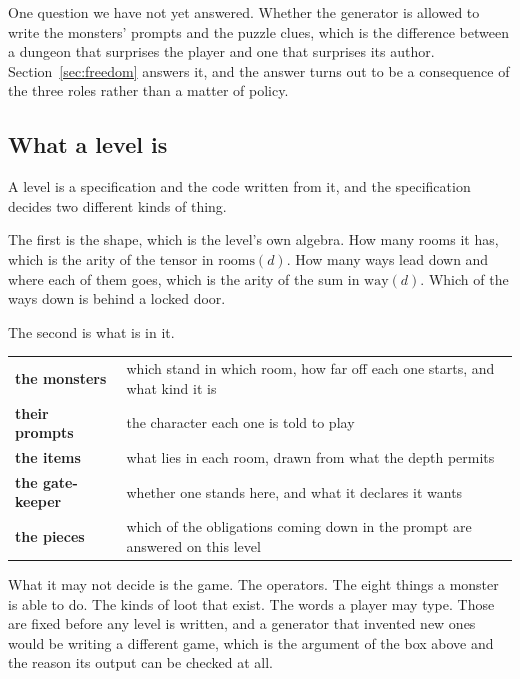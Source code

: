 \documentclass[11pt,a4paper]{article}
\begin{document}
One question we have not yet answered. Whether the generator is allowed to write the monsters'
prompts and the puzzle clues, which is the difference between a dungeon that surprises the player
and one that surprises its author. Section~\ref{sec:freedom} answers it, and the answer turns out
to be a consequence of the three roles rather than a matter of policy.

\subsection{What a level is}

A level is a specification and the code written from it, and the specification decides two
different kinds of thing.

The first is the shape, which is the level's own algebra. How many rooms it has, which is the
arity of the tensor in $\text{rooms}(d)$. How many ways lead down and where each of them goes,
which is the arity of the sum in $\text{way}(d)$. Which of the ways down is behind a locked door.

The second is what is in it.

\begin{center}
\begin{tabular}{@{}l@{\hspace{6mm}}>{\raggedright\arraybackslash}p{}@{}}
\toprule
\textbf{the monsters} & which stand in which room, how far off each one starts, and what kind it is \\
\textbf{their prompts}& the character each one is told to play \\
\textbf{the items}    & what lies in each room, drawn from what the depth permits \\
\textbf{the gate-keeper}   & whether one stands here, and what it declares it wants \\
\textbf{the pieces}   & which of the obligations coming down in the prompt are answered on this level \\
\bottomrule
\end{tabular}
\end{center}

What it may not decide is the game. The operators. The eight things a monster is able to do. The
kinds of loot that exist. The words a player may type. Those are fixed before any level is
written, and a generator that invented new ones would be writing a different game, which is the
argument of the box above and the reason its output can be checked at all.
\end{document}
